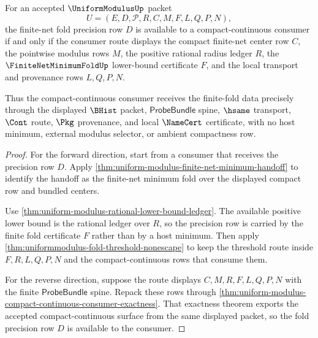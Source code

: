\begin{theorem}
\label{thm:uniformmodulus-compact-continuous-finite-fold-correspondence}
For an accepted $\UniformModulusUp$ packet
$$
U=(E,D,\mathcal{P},R,C,M,F,L,Q,P,N),
$$
the finite-net fold precision row $D$ is available to a compact-continuous
consumer if and only if the consumer route displays the compact finite-net
center row $C$, the pointwise modulus rows $M$, the positive rational radius
ledger $R$, the $\FiniteNetMinimumFoldUp$ lower-bound certificate $F$, and the
local transport and provenance rows $L,Q,P,N$.

Thus the compact-continuous consumer receives the finite-fold data precisely
through the displayed $\BHist$ packet, $\mathsf{ProbeBundle}$ spine,
$\hsame$ transport, $\Cont$ route, $\Pkg$ provenance, and local $\NameCert$
certificate, with no host minimum, external modulus selector, or ambient
compactness row.
\end{theorem}
\begin{proof}
For the forward direction, start from a consumer that receives the precision
row $D$. Apply \autoref{thm:uniform-modulus-finite-net-minimum-handoff} to
identify the handoff as the finite-net minimum fold over the displayed compact
row and bundled centers.

Use \autoref{thm:uniform-modulus-rational-lower-bound-ledger}. The available
positive lower bound is the rational ledger over $R$, so the precision row is
carried by the finite fold certificate $F$ rather than by a host minimum.
Then apply \autoref{thm:uniformmodulus-fold-threshold-nonescape} to keep the
threshold route inside $F,R,L,Q,P,N$ and the compact-continuous rows that
consume them.

For the reverse direction, suppose the route displays $C,M,R,F,L,Q,P,N$ with
the finite $\mathsf{ProbeBundle}$ spine. Repack these rows through
\autoref{thm:uniform-modulus-compact-continuous-consumer-exactness}. That
exactness theorem exports the accepted compact-continuous surface from the
same displayed packet, so the fold precision row $D$ is available to the
consumer.
\end{proof}

